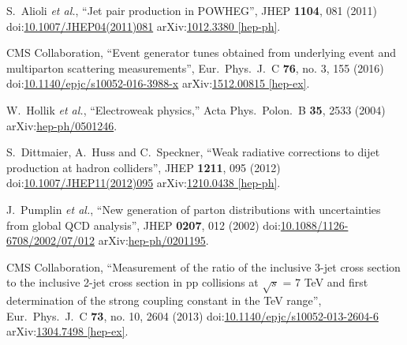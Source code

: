 \begin{thebibliography}{99}
S.~Alioli {\it et al.}, ``Jet pair production in POWHEG'', JHEP {\bf 1104}, 081 (2011) doi:\href{http://dx.doi.org/10.1007/JHEP04(2011)081}{10.1007/JHEP04(2011)081} arXiv:\href{https://arxiv.org/abs/1012.3380}{1012.3380 [hep-ph]}.

CMS Collaboration, ``Event generator tunes obtained from underlying event and multiparton scattering measurements'', Eur.\ Phys.\ J.\ C {\bf 76}, no. 3, 155 (2016) doi:\href{http://dx.doi.org/10.1140/epjc/s10052-016-3988-x}{10.1140/epjc/s10052-016-3988-x} arXiv:\href{https://arxiv.org/abs/1512.00815}{1512.00815 [hep-ex]}.
  
W.~Hollik {\it et al.}, ``Electroweak physics,'' Acta Phys.\ Polon.\ B {\bf 35}, 2533 (2004) arXiv:\href{https://arxiv.org/abs/hep-ph/0501246}{hep-ph/0501246}.
    
S.~Dittmaier, A.~Huss and C.~Speckner, ``Weak radiative corrections to dijet production at hadron colliders'', JHEP {\bf 1211}, 095 (2012) doi:\href{http://dx.doi.org/10.1007/JHEP11(2012)095}{10.1007/JHEP11(2012)095} arXiv:\href{https://arxiv.org/abs/1210.0438}{1210.0438 [hep-ph]}.
  

J.~Pumplin {\it et al.}, ``New generation of parton distributions with uncertainties from global QCD analysis'', JHEP {\bf 0207}, 012 (2002) doi:\href{http://dx.doi.org/10.1088/1126-6708/2002/07/012}{10.1088/1126-6708/2002/07/012} arXiv:\href{https://arxiv.org/abs/hep-ph/0201195}{hep-ph/0201195}.
    
CMS Collaboration, ``Measurement of the ratio of the inclusive 3-jet cross section to the inclusive 2-jet cross section in pp collisions at $\sqrt{s}$ = 7 TeV and first determination of the strong coupling constant in the TeV range'', Eur.\ Phys.\ J.\ C {\bf 73}, no. 10, 2604 (2013) doi:\href{http://dx.doi.org/10.1140/epjc/s10052-013-2604-6}{10.1140/epjc/s10052-013-2604-6} arXiv:\href{https://arxiv.org/abs/1304.7498}{1304.7498 [hep-ex]}.


\end{thebibliography}
